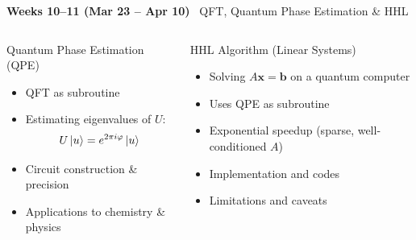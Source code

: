 \documentclass[aspectratio=169,10pt]{beamer}
\newcommand{\week}[1]{\textcolor{blue!60!black}{\textbf{#1}}}
\begin{document}
\begin{frame}{\week{Weeks 10--11 (Mar 23 -- Apr 10)} \ QFT, Quantum Phase Estimation \& HHL}
  \begin{columns}[T]
      \begin{block}{Quantum Phase Estimation (QPE)}
        \begin{itemize}
          \item QFT as subroutine
          \item Estimating eigenvalues of $U$:
                \[
                  U\ket{u} = e^{2\pi i\varphi}\ket{u}
                \]
          \item Circuit construction \& precision
          \item Applications to chemistry \& physics
        \end{itemize}
      \end{block}
      \begin{block}{HHL Algorithm (Linear Systems)}
        \begin{itemize}
          \item Solving $A\bm{x}=\bm{b}$ on a quantum computer
          \item Uses QPE as subroutine
          \item Exponential speedup (sparse, well-conditioned $A$)
          \item Implementation and codes
          \item Limitations and caveats
        \end{itemize}
      \end{block}
  \end{columns}
\end{frame}
\end{document}
